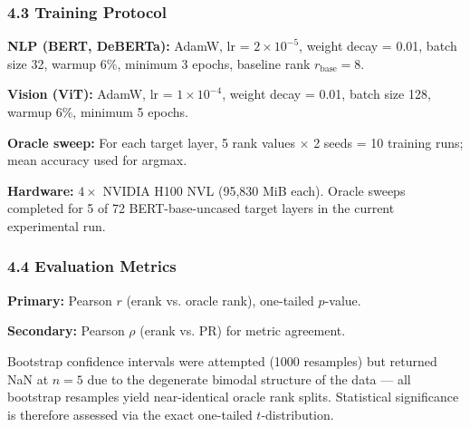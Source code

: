 \subsubsection{4.3 Training Protocol}

\textbf{NLP (BERT, DeBERTa):} AdamW, lr = $2 \times 10^{-5}$, weight decay = 0.01, batch size 32, warmup 6\%, minimum 3 epochs, baseline rank $r_{\text{base}} = 8$.

\textbf{Vision (ViT):} AdamW, lr = $1 \times 10^{-4}$, weight decay = 0.01, batch size 128, warmup 6\%, minimum 5 epochs.

\textbf{Oracle sweep:} For each target layer, 5 rank values $\times$ 2 seeds = 10 training runs; mean accuracy used for argmax.

\textbf{Hardware:} $4\times$ NVIDIA H100 NVL (95,830 MiB each). Oracle sweeps completed for 5 of 72 BERT-base-uncased target layers in the current experimental run.

\subsubsection{4.4 Evaluation Metrics}

\textbf{Primary:} Pearson $r$ (erank vs. oracle rank), one-tailed $p$-value.

\textbf{Secondary:} Pearson $\rho$ (erank vs. PR) for metric agreement.

Bootstrap confidence intervals were attempted (1000 resamples) but returned NaN at $n = 5$ due to the degenerate bimodal structure of the data --- all bootstrap resamples yield near-identical oracle rank splits. Statistical significance is therefore assessed via the exact one-tailed $t$-distribution.


